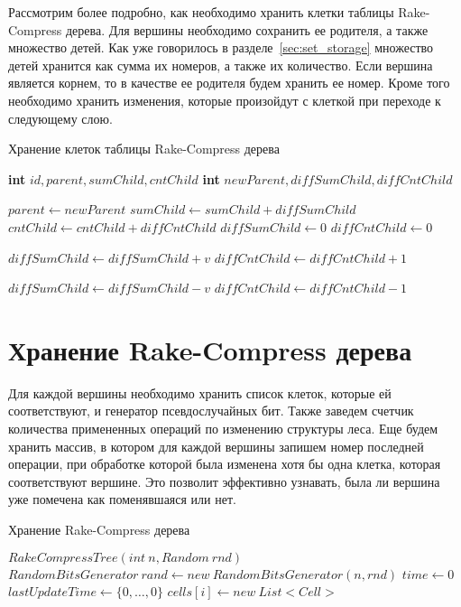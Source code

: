 Рассмотрим более подробно, как необходимо хранить клетки таблицы Rake-Compress дерева. 
Для вершины необходимо сохранить ее родителя, а также множество детей. 
Как уже говорилось в разделе~\ref{sec:set_storage} множество детей хранится как сумма их номеров, а также их количество.
Если вершина является корнем, то в качестве ее родителя будем хранить ее номер.
Кроме того необходимо хранить изменения, которые произойдут с клеткой при переходе к следующему слою.

\FloatBarrier
\begin{algorithm}
\caption{Хранение клеток таблицы Rake-Compress дерева}\label{algo:cell}
\begin{algorithmic}[1]
\State \textbf{int} $id, parent, sumChild, cntChild$
\State \textbf{int} $newParent, diffSumChild, diffCntChild$

\Statex
{}
	\State $parent \gets newParent$
	\State $sumChild \gets sumChild + diffSumChild$
	\State $cntChild \gets cntChild + diffCntChild$
	\State $diffSumChild \gets 0$
	\State $diffCntChild \gets 0$
\EndProcedure

\Statex
{}
	\State $diffSumChild \gets diffSumChild + v$
	\State $diffCntChild \gets diffCntChild + 1$
\EndProcedure

\Statex
{}
	\State $diffSumChild \gets diffSumChild - v$
	\State $diffCntChild \gets diffCntChild - 1$
\EndProcedure

\end{algorithmic}
\end{algorithm}

\FloatBarrier
\section{Хранение Rake-Compress дерева}   

Для каждой вершины необходимо хранить список клеток, которые ей соответствуют, и 
 генератор псевдослучайных бит. 
Также заведем счетчик количества примененных операций по изменению структуры леса.
Еще будем хранить массив, в котором для каждой вершины запишем номер последней операции, 
при обработке которой была изменена хотя бы одна клетка, которая соответствуют вершине.
Это позволит эффективно узнавать, была ли вершина уже помечена как поменявшаяся или нет.

\FloatBarrier
\begin{algorithm}
\caption{Хранение Rake-Compress дерева}\label{algo:rc_tree_storage}
\begin{algorithmic}[1]
\State $RakeCompressTree(int \ n, Random \ rnd)$
\State $RandomBitsGenerator \ rand \gets new \ RandomBitsGenerator(n, rnd)$
\State $time \gets 0$
\State $lastUpdateTime \gets \{0, \ldots, 0\}$
	\State $cells[i] \gets new \ List<Cell>$ 
\EndFor

\end{algorithmic}
\end{algorithm}


